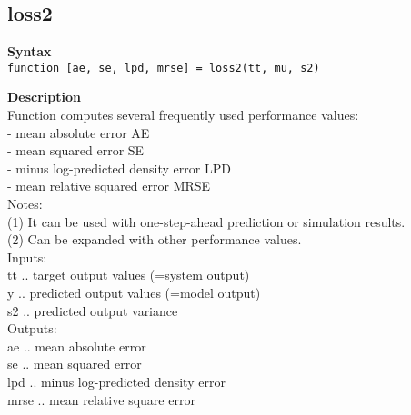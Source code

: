 \subsection*{loss2} \label{fun:loss2}


\textbf{Syntax}
\\ \texttt{function [ae, se, lpd, mrse] = loss2(tt, mu, s2)}


\textbf{Description}
\\ Function computes several frequently used performance values:
\\ - mean absolute error AE
\\ - mean squared error SE
\\ - minus log-predicted density error LPD
\\ -  mean relative squared error MRSE
\\ Notes:
\\ (1) It can be used with one-step-ahead prediction or simulation results.
\\ (2) Can be expanded with other performance values.
\\ Inputs:
\\ tt .. target output values (=system output)
\\ y .. predicted output values (=model output)
\\ s2 .. predicted output variance
\\ Outputs:
\\ ae .. mean absolute error
\\ se .. mean squared error
\\ lpd .. minus log-predicted density error
\\ mrse .. mean relative square error
